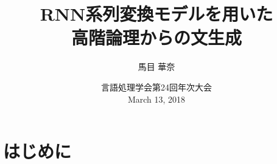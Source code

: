 \documentclass[dvipdfmx]{beamer}
\title{RNN系列変換モデルを用いた\\高階論理からの文生成}
\author[]{馬目 華奈}
\institute{お茶の水女子大学 戸次研究室}
\date{
言語処理学会第24回年次大会\\
March 13, 2018
}
\begin{document}
\begin{frame}
  \titlepage
\end{frame}


\section{はじめに}

\end{document}
